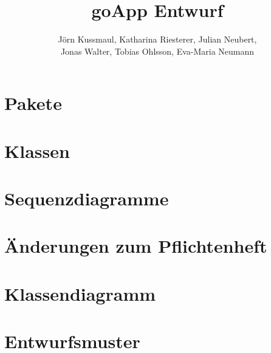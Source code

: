 \documentclass{report}
\title{goApp Entwurf}
\author{Jörn Kussmaul, Katharina Riesterer, Julian Neubert,\\ Jonas Walter, Tobias Ohlsson, Eva-Maria Neumann}
\begin{document}
	\maketitle
	\newpage
	\tableofcontents
	\newpage
	\section{Pakete}
	\section{Klassen}
	\section{Sequenzdiagramme}
	\section{Änderungen zum Pflichtenheft}
	\section{Klassendiagramm}
	\section{Entwurfsmuster}
\end{document}
